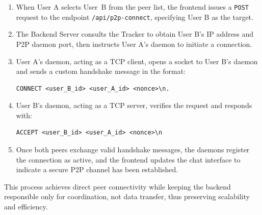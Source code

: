 \begin{enumerate}
    \item When User A selects User~B from the peer list, the frontend issues a \texttt{POST} request to the endpoint \texttt{/api/p2p-connect}, specifying User B as the target.
    \item The Backend Server consults the Tracker to obtain User B’s IP address and P2P daemon port, then instructs User A’s daemon to initiate a connection.
    \item User A’s daemon, acting as a TCP client, opens a socket to User B’s daemon and sends a custom handshake message in the format:
    \begin{lstlisting}
CONNECT <user_B_id> <user_A_id> <nonce>\n.
    \end{lstlisting}
    
    \item User B’s daemon, acting as a TCP server, verifies the request and responds with:
    \begin{lstlisting}
ACCEPT <user_B_id> <user_A_id> <nonce>\n     
    \end{lstlisting}

    \item Once both peers exchange valid handshake messages, the daemons register the connection as active, and the frontend updates the chat interface to indicate a secure P2P channel has been established.
\end{enumerate}

This process achieves direct peer connectivity while keeping the backend responsible only for coordination, not data transfer, thus preserving scalability and efficiency.


